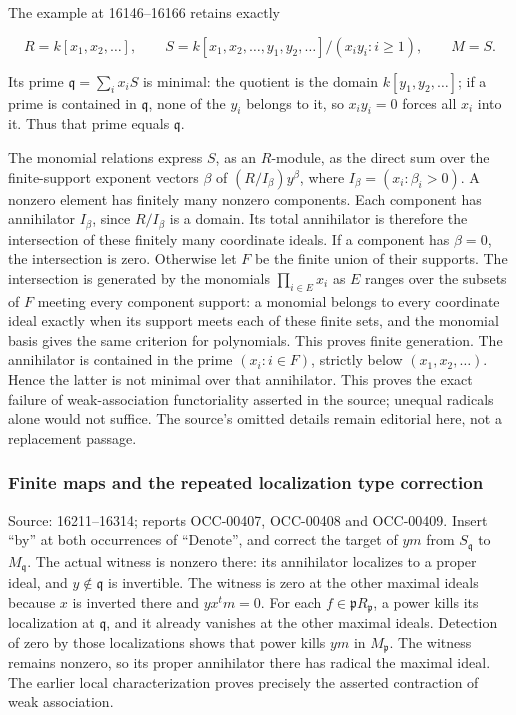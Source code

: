 The example at 16146--16166 retains exactly

\[
R=k[x_1,x_2,\ldots],\qquad
S=k[x_1,x_2,\ldots,y_1,y_2,\ldots]/(x_iy_i:i\geq1),\qquad M=S.
\]

Its prime \(\mathfrak q=\sum_i x_iS\) is minimal: the quotient is the domain \(k[y_1,y_2,\ldots]\); if a prime is contained in \(\mathfrak q\), none of the \(y_i\) belongs to it, so \(x_iy_i=0\) forces all \(x_i\) into it. Thus that prime equals \(\mathfrak q\).

The monomial relations express \(S\), as an \(R\)-module, as the direct sum over the finite-support exponent vectors \(\beta\) of \((R/I_\beta)y^\beta\), where \(I_\beta=(x_i:\beta_i>0)\). A nonzero element has finitely many nonzero components. Each component has annihilator \(I_\beta\), since \(R/I_\beta\) is a domain. Its total annihilator is therefore the intersection of these finitely many coordinate ideals. If a component has \(\beta=0\), the intersection is zero. Otherwise let \(F\) be the finite union of their supports. The intersection is generated by the monomials \(\prod_{i\in E}x_i\) as \(E\) ranges over the subsets of \(F\) meeting every component support: a monomial belongs to every coordinate ideal exactly when its support meets each of these finite sets, and the monomial basis gives the same criterion for polynomials. This proves finite generation. The annihilator is contained in the prime \((x_i:i\in F)\), strictly below \((x_1,x_2,\ldots)\). Hence the latter is not minimal over that annihilator. This proves the exact failure of weak-association functoriality asserted in the source; unequal radicals alone would not suffice. The source's omitted details remain editorial here, not a replacement passage.

\subsubsection{Finite maps and the repeated localization type correction}\label{algebra-proof-005-finite-maps-and-the-repeated-localization-type-correction}

Source: 16211--16314; reports OCC-00407, OCC-00408 and OCC-00409. Insert ``by'' at both occurrences of ``Denote'', and correct the target of \(ym\) from \(S_{\mathfrak q}\) to \(M_{\mathfrak q}\). The actual witness is nonzero there: its annihilator localizes to a proper ideal, and \(y\notin\mathfrak q\) is invertible. The witness is zero at the other maximal ideals because \(x\) is inverted there and \(yx^tm=0\). For each \(f\in\mathfrak pR_{\mathfrak p}\), a power kills its localization at \(\mathfrak q\), and it already vanishes at the other maximal ideals. Detection of zero by those localizations shows that power kills \(ym\) in \(M_{\mathfrak p}\). The witness remains nonzero, so its proper annihilator there has radical the maximal ideal. The earlier local characterization proves precisely the asserted contraction of weak association.

